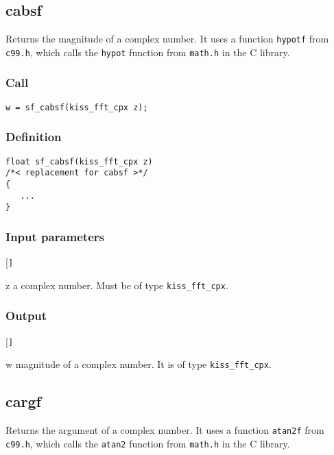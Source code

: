 \subsection{{cabsf}}
Returns the magnitude of a complex number. It uses a function \texttt{hypotf} from \texttt{c99.h}, which calls the \texttt{hypot} function from \texttt{math.h} in the C library.

\subsubsection*{Call}
\begin{verbatim}w = sf_cabsf(kiss_fft_cpx z);\end{verbatim}

\subsubsection*{Definition}
\begin{verbatim}
float sf_cabsf(kiss_fft_cpx z)
/*< replacement for cabsf >*/
{
   ...
}
\end{verbatim}

\subsubsection*{Input parameters}
\begin{desclist}{\tt }{\quad}[\tt ]
   \setlength\itemsep{0pt}
   \item[z] a complex number. Must be of type \texttt{kiss\_fft\_cpx}.
\end{desclist}

\subsubsection*{Output}
\begin{desclist}{\tt }{\quad}[\tt ]
   \setlength\itemsep{0pt}
   \item[w] magnitude of a complex number. It is of type \texttt{kiss\_fft\_cpx}.
\end{desclist}




\subsection{{cargf}}
Returns the argument of a complex number. It uses a function \texttt{atan2f} from \texttt{c99.h}, which calls the \texttt{atan2} function from \texttt{math.h} in the C library.

